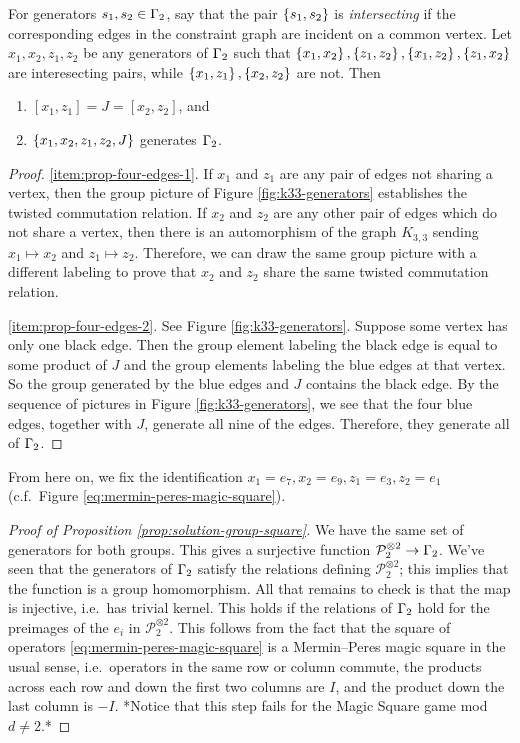\begin{lemma}\label{prop:four-edges}
	For generators $s_1,s_2 \in \Gamma_2$, say that the pair $\left\{s_1,s_2\right\}$ is \emph{intersecting} if the corresponding edges in the constraint graph are incident on a common vertex.
 	Let $x_1,x_2,z_1,z_2$ be any generators of $\Gamma_2$ such that $\left\{x_1,x_2\right\},\left\{z_1,z_2\right\},\left\{x_1,z_2\right\},\left\{z_1,x_2\right\}$ are interesecting pairs, while $\left\{x_1,z_1\right\},\left\{x_2,z_2\right\}$ are not.
 	Then
 	\begin{enumerate}
 		\item\label{item:prop-four-edges-1} $[x_1,z_1] = J = [x_2,z_2]$, and
 	 	\item\label{item:prop-four-edges-2} $\left\{x_1,x_2,z_1,z_2, J\right\}$ generates $\Gamma_2$.
 	\end{enumerate}
 \end{lemma} 
 \begin{proof}

 	\ref{item:prop-four-edges-1}. If $x_1$ and $z_1$ are any pair of edges not sharing a vertex, then the group picture of Figure \ref{fig:k33-generators} establishes the twisted commutation relation. If $x_2$ and $z_2$ are any other pair of edges which do not share a vertex, then there is an automorphism of the graph $K_{3,3}$ sending $x_1\mapsto x_2$ and $z_1\mapsto z_2$. Therefore, we can draw the same group picture with a different labeling to prove that $x_2$ and $z_2$ share the same twisted commutation relation.
 	
 	\ref{item:prop-four-edges-2}. See Figure \ref{fig:k33-generators}. Suppose some vertex has only one black edge. Then the group element labeling the black edge is equal to some product of $J$ and the group elements labeling the blue edges at that vertex. So the group generated by the blue edges and $J$ contains the black edge. By the sequence of pictures in Figure \ref{fig:k33-generators}, we see that the four blue edges, together with $J$, generate all nine of the edges. Therefore, they generate all of $\Gamma_2$.
 \end{proof}
From here on, we fix the identification $x_1 = e_7, x_2 = e_9, z_1 = e_3, z_2 = e_1$ (c.f.\ Figure \ref{eq:mermin-peres-magic-square}).

\begin{proof}[Proof of Proposition \ref{prop:solution-group-square}]
	We have the same set of generators for both groups. This gives a surjective function $\mathcal{P}_2^{\otimes 2}\to \Gamma_2$. We've seen that the generators of $\Gamma_2$ satisfy the relations defining $\mathcal{P}_2^{\otimes 2}$; this implies that the function is a group homomorphism. All that remains to check is that the map is injective, i.e.\ has trivial kernel. This holds if the relations of $\Gamma_2$ hold for the preimages of the $e_i$ in $\mathcal{P}_2^{\otimes 2}$. This follows from the fact that the square of operators \eqref{eq:mermin-peres-magic-square} is a Mermin--Peres magic square in the usual sense, i.e.\ operators in the same row or column commute, the products across each row and down the first two columns are $I$, and the product down the last column is $-I$. *Notice that this step fails for the Magic Square game mod $d \neq 2$.*
	
\end{proof}


